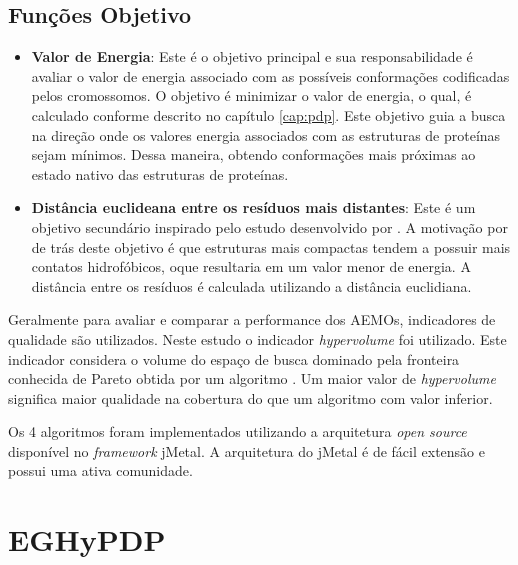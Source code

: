 \subsection{Funções Objetivo}


\begin{itemize}
	\item \textbf{Valor de Energia}: Este é o objetivo principal e sua responsabilidade é avaliar o valor de energia associado com as possíveis conformações codificadas pelos cromossomos. O objetivo é minimizar o valor de energia, o qual, é calculado conforme descrito no capítulo \ref{cap:pdp}. Este objetivo guia a busca na direção onde os valores energia associados com as estruturas de proteínas sejam mínimos. Dessa maneira, obtendo conformações mais próximas ao estado nativo das estruturas de proteínas.

    \item \textbf{Distância euclideana entre os resíduos mais distantes}: Este é um objetivo secundário inspirado pelo estudo desenvolvido por \cite{gabriel2012algoritmos}. A motivação por de trás deste objetivo é que estruturas mais compactas tendem a possuir mais contatos hidrofóbicos, oque resultaria em um valor menor de energia. A distância entre os resíduos é calculada utilizando a distância euclidiana.
   
\end{itemize}

Geralmente para avaliar e comparar a performance dos AEMOs, indicadores de qualidade são utilizados. Neste estudo o indicador \textit{hypervolume} foi utilizado. Este indicador considera o volume do espaço de busca dominado pela fronteira conhecida de Pareto obtida por um algoritmo \cite{zitzler2003performance}. Um maior valor de \textit{hypervolume} significa maior qualidade na cobertura do que um algoritmo com valor inferior.

Os 4 algoritmos foram implementados utilizando a arquitetura \textit{open source} disponível no \textit{framework} jMetal. A arquitetura do jMetal é de fácil extensão e possui uma ativa comunidade.


\section{EGHyPDP}
\label{sec:eghypdp}

